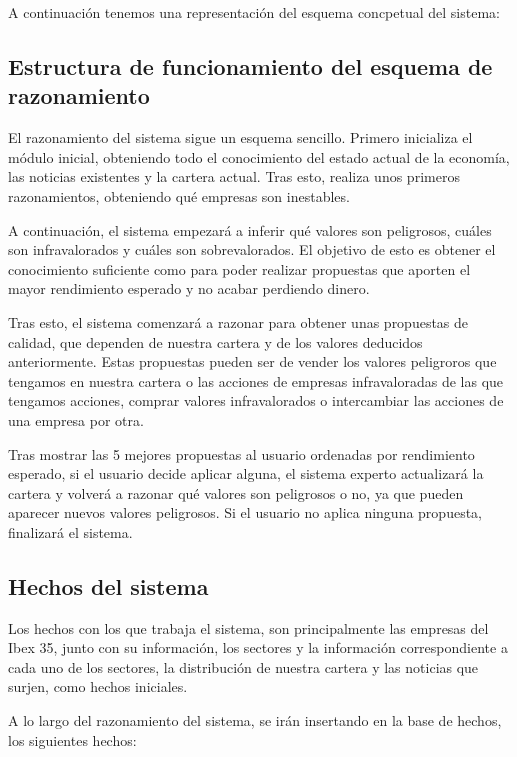 \documentclass[10pt,spanish]{article}
\theoremstyle{plain}
\theoremstyle{definition}
\begin{document}
A continuación tenemos una representación del esquema concpetual del sistema:



\subsection{Estructura de funcionamiento del esquema de razonamiento}

El razonamiento del sistema sigue un esquema sencillo. Primero inicializa el módulo inicial, obteniendo todo el conocimiento del estado actual de la economía, las noticias existentes y la cartera actual. Tras esto, realiza unos primeros razonamientos, obteniendo qué empresas son inestables.

A continuación, el sistema empezará a inferir qué valores son peligrosos, cuáles son infravalorados y cuáles son sobrevalorados. El objetivo de esto es obtener el conocimiento suficiente como para poder realizar propuestas que aporten el mayor rendimiento esperado y no acabar perdiendo dinero.

Tras esto, el sistema comenzará a razonar para obtener unas propuestas de calidad, que dependen de nuestra cartera y de los valores deducidos anteriormente. Estas propuestas pueden ser de vender los valores peligroros que tengamos en nuestra cartera o las acciones de empresas infravaloradas de las que tengamos acciones, comprar valores infravalorados o intercambiar las acciones de una empresa por otra.

Tras mostrar las 5 mejores propuestas al usuario ordenadas por rendimiento esperado, si el usuario decide aplicar alguna, el sistema experto actualizará la cartera y volverá a razonar qué valores son peligrosos o no, ya que pueden aparecer nuevos valores peligrosos. Si el usuario no aplica ninguna propuesta, finalizará el sistema.

\subsection{Hechos del sistema}

Los hechos con los que trabaja el sistema, son principalmente las empresas del Ibex 35, junto con su información, los sectores y la información correspondiente a cada uno de los sectores, la distribución de nuestra cartera y las noticias que surjen, como hechos iniciales. 

A lo largo del razonamiento del sistema, se irán insertando en la base de hechos, los siguientes hechos:
\end{document}
